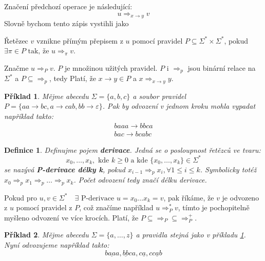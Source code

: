 \documentclass[10pt, a4paper, titlepage]{article}
\theoremstyle{note}
\newtheorem{definice}{Definice}
\newtheorem{priklad}{Příklad}
\begin{document}
Značení předchozí operace je následující:
$$
u \Rightarrow_{x \rightarrow y} v
$$
Slovně bychom tento zápis vystihli jako 

Řetězec $v$ vznikne přímým přepisem z $u$ pomocí pravidel $P \subseteq  \Sigma^{*} \times \Sigma^{*}$, pokud
$\exists \pi \in P \text{ tak, že } u \Rightarrow_{\pi} v$.

Značme $u \Rightarrow_{P} v$. $P$ je množinou užitých pravidel. $P$ i $\Rightarrow_{p}$ jsou binární relace na $\Sigma^{*}$ a
$P \subseteq  \Rightarrow_{p}$, tedy  Platí, že $x \rightarrow y \in P$ a $x \Rightarrow_{x \rightarrow y} y$.

\begin{priklad}
Mějme abecedu $\Sigma = \lbrace a, b, c \rbrace$ a soubor pravidel $P = \lbrace aa \rightarrow bc, a \rightarrow cab, bb \rightarrow \varepsilon \rbrace$\label{priklad-1}.
Pak by odvození v jednom kroku mohla vypadat například takto:
\begin{gather*}
baaa \rightarrow bbca \\
bac \rightarrow bcabc
\end{gather*}
\end{priklad}

\begin{definice}
Definujme pojem \textbf{derivace}. Jedná se o posloupnost řetězců ve tvaru:
$$
x_{0}, \ldots, x_{k},\text{ kde } k \geq 0\text{ a kde } \lbrace x_{0}, \ldots, x_{k} \rbrace \in \Sigma^{*}
$$
se nazývá \textbf{P-derivace délky k}, pokud $x_{i-1} \Rightarrow_{p} x_{i}, \forall 1 \leq i \leq k $.
Symbolicky totéž $x_{0} \Rightarrow_{p} x_{1} \Rightarrow_{p} \ldots \Rightarrow_{p} x_{k}$. Počet odvození tedy značí \emph{délku} derivace.
\end{definice}

Pokud pro $u, v \in \Sigma^{*} \quad \exists \text{ P-derivace } u = x_{0} \ldots x_{k} = v$, pak říkáme, že $v$ je odvozeno z $u$ pomocí pravidel z $P$, což značíme
například $u \Rightarrow_{P}^{*} v$, tímto je pochopitelně myšleno odvození ve více krocích. Platí, že $P \subseteq \Rightarrow_{P} \subseteq \Rightarrow_{P}^{+}$.

\begin{priklad}
Mějme abecedu $\Sigma = \lbrace a, \ldots, z \rbrace$ a pravidla stejná jako v příkladu \ref{priklad-1}.
Nyní odvozujeme například takto:
$$
b\underline{aa}a, \underline{bb}ca, c\underline{a}, c\underline{cab}
$$
\end{priklad}
\end{document}
